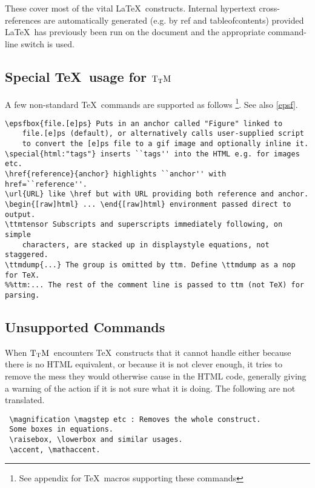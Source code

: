 \documentclass[12pt]{article}
\def\ttmdump{}
\def\TtM{$\rm{}T_TH$}
\def\TtM{$\rm{}T_TM$}%
\begin{document}
 These cover most of the vital \LaTeX\ constructs.  Internal hypertext
cross-references are automatically generated (e.g. by ref and
tableofcontents) provided \LaTeX\ has previously been run on the
document and the appropriate command-line switch is used.

\subsection{Special \TeX\ usage for \TtM}
 A few non-standard \TeX\ commands are supported as follows
\footnote{See appendix for \TeX\ macros supporting these commands}. See
also \ref{epsf}.
 {\begin{verbatim}
\epsfbox{file.[e]ps} Puts in an anchor called "Figure" linked to 
    file.[e]ps (default), or alternatively calls user-supplied script 
    to convert the [e]ps file to a gif image and optionally inline it.  
\special{html:"tags"} inserts ``tags'' into the HTML e.g. for images etc.  
\href{reference}{anchor} highlights ``anchor'' with href=``reference''.
\url{URL} like \href but with URL providing both reference and anchor.
\begin{[raw]html} ... \end{[raw]html} environment passed direct to output.
\ttmtensor Subscripts and superscripts immediately following, on simple
    characters, are stacked up in displaystyle equations, not staggered. 
\ttmdump{...} The group is omitted by ttm. Define \ttmdump as a nop for TeX.
%%ttm:... The rest of the comment line is passed to ttm (not TeX) for parsing.
\end{verbatim} }


\subsection{Unsupported Commands}

 When \TtM\ encounters \TeX\ constructs that it cannot handle either
because there is no HTML equivalent, or because it is not clever
enough, it tries to remove the mess they would otherwise cause in the
HTML code, generally giving a warning of the action if it is not sure
what it is doing. The following are
not translated.

{\begin{verbatim}
 \magnification \magstep etc : Removes the whole construct.
 Some boxes in equations.
 \raisebox, \lowerbox and similar usages.
 \accent, \mathaccent. 
\end{verbatim} }
\end{document}
